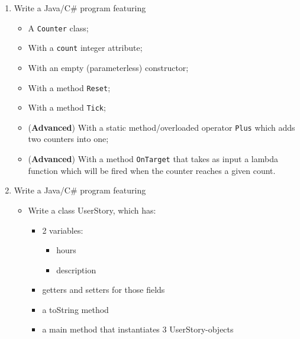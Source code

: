 \begin{enumerate}
            \item Write a Java/C\# program featuring
            \begin{itemize}
                \item A \texttt{Counter} class;
                \item With a \texttt{count} integer attribute;
                \item With an empty (parameterless) constructor;
                \item With a method \texttt{Reset};
                \item With a method \texttt{Tick};
                \item (\textbf{Advanced}) With a static method/overloaded operator \texttt{Plus} which adds two counters into one;
                \item (\textbf{Advanced}) With a method \texttt{OnTarget} that takes as input a lambda function which will be fired when the counter reaches a given count.
            \end{itemize}

            \item Write a Java/C\# program featuring
                \begin{itemize}
                    \item Write a class UserStory, which has:
                    \begin{itemize}
                        \item 2 variables:
                            \begin{itemize}
                                \item hours
                                \item description
                            \end{itemize}

                        \item getters and setters for those fields
                        \item a toString method
                        \item a main method that instantiates 3 UserStory-objects
                    \end{itemize}


\end{itemize}
\end{enumerate}
